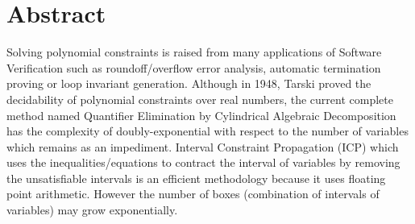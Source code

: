 \chapter*{\centering Abstract} 
Solving polynomial constraints is raised from many applications of Software Verification such as roundoff/overflow error analysis, automatic termination proving or loop invariant generation. Although in 1948, Tarski proved the decidability of polynomial constraints over real numbers, the current complete method named Quantifier Elimination by Cylindrical Algebraic Decomposition has the complexity of doubly-exponential with respect to the number of variables which remains as an impediment. Interval Constraint Propagation (ICP) which uses the inequalities/equations to contract the interval of variables by removing the unsatisfiable intervals is an efficient methodology because it uses floating point arithmetic. However the number of boxes (combination of intervals of variables) may grow exponentially.

